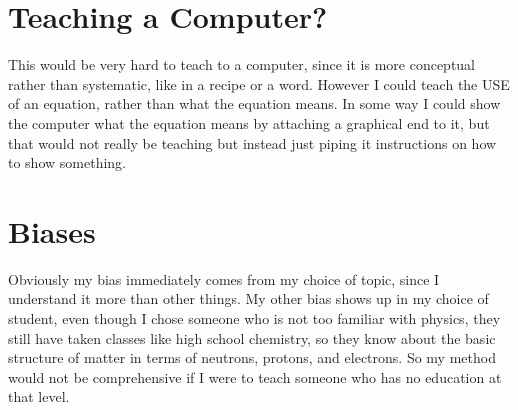 \documentclass[12pt, letterpaper]{article}
\begin{document}
\section{Teaching a Computer?}
This would be very hard to teach to a computer, since it is more conceptual rather than systematic, like in a recipe or a word. However I could teach the USE of an equation, rather than what the equation means. In some way I could show the computer what the equation means by attaching a graphical end to it, but that would not really be teaching but instead just piping it instructions on how to show something. 
\section{Biases}
Obviously my bias immediately comes from my choice of topic, since I understand it more than other things. My other bias shows up in my choice of student, even though I chose someone who is not too familiar with physics, they still have taken classes like high school chemistry, so they know about the basic structure of matter in terms of neutrons, protons, and electrons. So my method would not be comprehensive if I were to teach someone who has no education at that level. 
\end{document}
